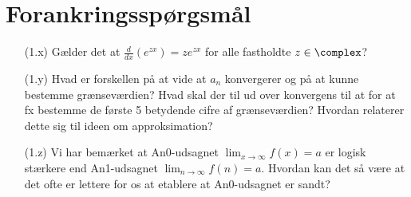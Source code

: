 \section*{Forankringssp\o{}rgsm\aa{}l}

\begin{itemize}
\item[(1.x)] G\ae{}lder det at $\frac d{dx}(e^{zx})=ze^{zx}$ for alle fastholdte $z\in \complex$?
\item[(1.y)] Hvad er forskellen p\aa{} at vide at $a_n$ konvergerer og p\aa{} at kunne bestemme gr\ae{}nsev\ae{}rdien? Hvad skal der til ud over konvergens til at for at fx bestemme de f\o{}rste 5 betydende cifre af gr\ae{}nsev\ae{}rdien? Hvordan relaterer dette sig til ideen om approksimation?
\item[(1.z)] Vi har bem\ae{}rket at An0-udsagnet $\lim_{x\to \infty}f(x)=a$ er logisk st\ae{}rkere end An1-udsagnet $\lim_{n\to \infty}f(n)=a$. Hvordan kan det s\aa{} v\ae{}re at det ofte er lettere for os at etablere at An0-udsagnet er sandt?
\end{itemize}

%


